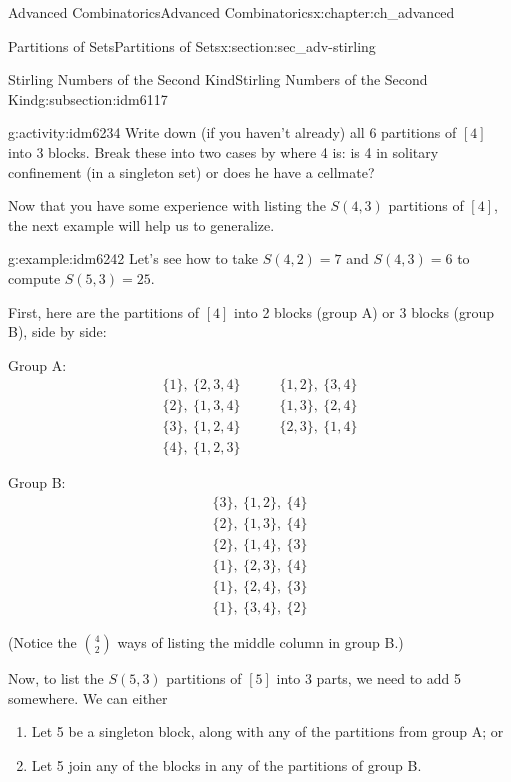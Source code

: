 \documentclass[oneside,10pt,]{book}
\numberwithin{equation}{chapter}
\newcommand{\amp}{&}
\begin{document}
\begin{chapterptx}{Advanced Combinatorics}{}{Advanced Combinatorics}{}{}{x:chapter:ch_advanced}
\begin{sectionptx}{Partitions of Sets}{}{Partitions of Sets}{}{}{x:section:sec_adv-stirling}
\begin{subsectionptx}{Stirling Numbers of the Second Kind}{}{Stirling Numbers of the Second Kind}{}{}{g:subsection:idm6117}
\begin{activity}{}{g:activity:idm6234}%
Write down (if you haven't already) all 6 partitions of \([4]\) into \(3\) blocks.  Break these into two cases by where 4 is: is 4 in solitary confinement (in a singleton set) or does he have a cellmate?%
\end{activity}
Now that you have some experience with listing the \(S(4,3)\) partitions of \([4]\), the next example will help us to generalize.%
\begin{example}{}{g:example:idm6242}%
Let's see how to take \(S(4,2) = 7\) and \(S(4,3) = 6\) to compute \(S(5,3) = 25\).%
\par
First, here are the partitions of \([4]\) into 2 blocks (group A) or 3 blocks (group B), side by side:%
\begin{sidebyside}{2}{0.05}{0.05}{0.1}%
\begin{sbspanel}{0.5}%
Group A:%
\begin{align*}
\{1\}, ~ \{2,3,4\}\qquad \amp \{1,2\}, ~ \{3, 4\}\\
\{2\}, ~ \{1,3,4\}\qquad \amp \{1,3\}, ~ \{2, 4\}\\
\{3\}, ~ \{1,2,4\} \qquad \amp \{2,3\}, ~ \{1, 4\}\\
\{4\}, ~ \{1,2,3\} \qquad\amp 
\end{align*}
%
\end{sbspanel}%
\begin{sbspanel}{0.3}%
\par
Group B:%
\begin{gather*}
\{3\}, ~ \{1,2\}, ~ \{4\}\\
\{2\}, ~ \{1,3\}, ~ \{4\}\\
\{2\}, ~ \{1,4\}, ~ \{3\}\\
\{1\}, ~ \{2,3\}, ~ \{4\}\\
\{1\}, ~ \{2,4\}, ~ \{3\}\\
\{1\}, ~ \{3,4\}, ~ \{2\}
\end{gather*}
%
\end{sbspanel}%
\end{sidebyside}%
\par
(Notice the \(\binom{4}{2}\) ways of listing the middle column in group B.)%
\par
Now, to list the \(S(5,3)\) partitions of \([5]\) into \(3\) parts, we need to add 5 somewhere.  We can either%
\begin{enumerate}[label=\alph*.]
\item{}Let 5 be a singleton block, along with any of the partitions from group A; or%
\item{}Let 5 join any of the blocks in any of the partitions of group B.%

\end{enumerate}
\end{example}
\end{subsectionptx}
\end{sectionptx}
\end{chapterptx}
\end{document}

